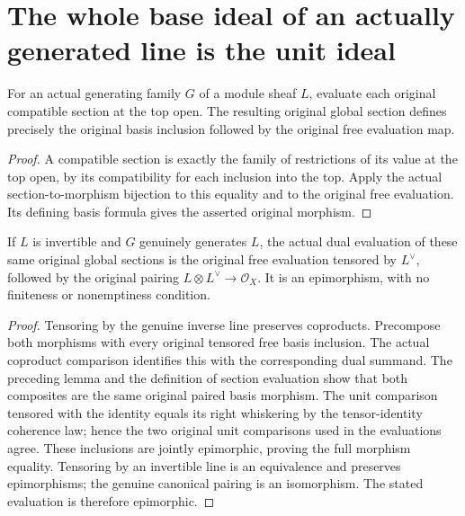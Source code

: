 \section{The whole base ideal of an actually generated line is the unit ideal}

\begin{lemma}
\label{lem:generated-line-top-sections}
\leanok
{}
For an actual generating family $G$ of a module sheaf $L$,
evaluate each original compatible section at the top open.
The resulting original global section defines precisely the
original basis inclusion followed by the original free evaluation map.
\end{lemma}
\begin{proof}
A compatible section is exactly the family of restrictions
of its value at the top open, by its compatibility for each
inclusion into the top. Apply the actual section-to-morphism
bijection to this equality and to the original free evaluation.
Its defining basis formula gives the asserted original morphism.
\end{proof}

\begin{lemma}
\label{lem:generated-line-dual-evaluation-epi}
\leanok
{}
If $L$ is invertible and $G$ genuinely generates $L$, the
actual dual evaluation of these same original global sections
is the original free evaluation tensored by $L^\vee$, followed
by the original pairing $L\otimes L^\vee\to\mathcal O_X$.
It is an epimorphism, with no finiteness or nonemptiness condition.
\end{lemma}
\begin{proof}
Tensoring by the genuine inverse line preserves coproducts.
Precompose both morphisms with every original tensored free
basis inclusion. The actual coproduct comparison identifies
this with the corresponding dual summand. The preceding
lemma and the definition of section evaluation show that both
composites are the same original paired basis morphism.
The unit comparison tensored with the identity equals its right
whiskering by the tensor-identity coherence law; hence the two
original unit comparisons used in the evaluations agree.
These inclusions are jointly epimorphic, proving the full
morphism equality. Tensoring by an invertible line is an
equivalence and preserves epimorphisms; the genuine canonical
pairing is an isomorphism. The stated evaluation is therefore
epimorphic.
\end{proof}

